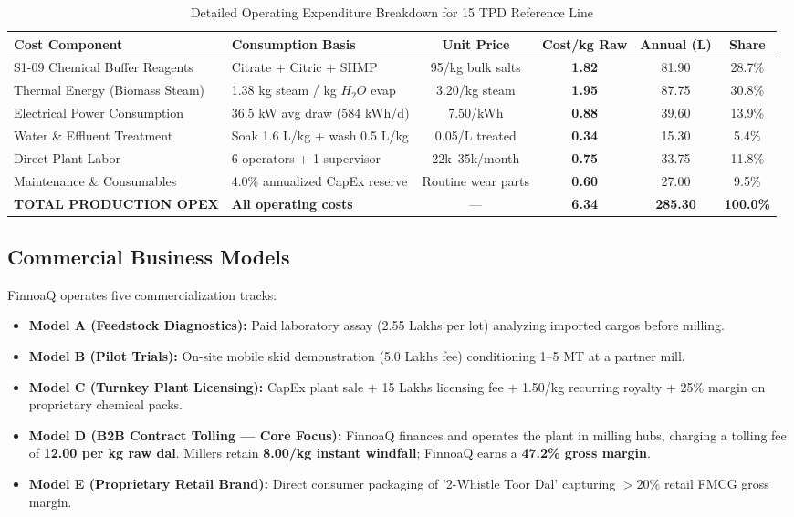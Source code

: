 \documentclass[10pt,a4paper]{article}
\newcommand{\inr}{\text{INR~}}
\begin{document}
\begin{table}[H]
\centering
\small
\caption{Detailed Operating Expenditure Breakdown for 15 TPD Reference Line}
\label{tab:opex_breakdown}
\begin{tabularx}{\linewidth}{p{3.6cm}Xcccc}
\toprule
\textbf{Cost Component} & \textbf{Consumption Basis} & \textbf{Unit Price} & \textbf{Cost/kg Raw} & \textbf{Annual (\inr L)} & \textbf{Share} \\
\midrule
S1-09 Chemical Buffer Reagents & Citrate + Citric + SHMP & \inr 95/kg bulk salts & \textbf{\inr 1.82} & 81.90 & 28.7\% \\
Thermal Energy (Biomass Steam) & 1.38 kg steam / kg $H_2O$ evap & \inr 3.20/kg steam & \textbf{\inr 1.95} & 87.75 & 30.8\% \\
Electrical Power Consumption & 36.5 kW avg draw (584 kWh/d) & \inr 7.50/kWh & \textbf{\inr 0.88} & 39.60 & 13.9\% \\
Water \& Effluent Treatment & Soak 1.6 L/kg + wash 0.5 L/kg & \inr 0.05/L treated & \textbf{\inr 0.34} & 15.30 & 5.4\% \\
Direct Plant Labor & 6 operators + 1 supervisor & \inr 22k--35k/month & \textbf{\inr 0.75} & 33.75 & 11.8\% \\
Maintenance \& Consumables & 4.0\% annualized CapEx reserve & Routine wear parts & \textbf{\inr 0.60} & 27.00 & 9.5\% \\
\midrule
\textbf{TOTAL PRODUCTION OPEX} & \textbf{All operating costs} & --- & \textbf{\inr 6.34} & \textbf{285.30} & \textbf{100.0\%} \\
\bottomrule
\end{tabularx}
\end{table}

\subsection{Commercial Business Models}
FinnoaQ operates five commercialization tracks:
\begin{itemize}[leftmargin=*]
    \item \textbf{Model A (Feedstock Diagnostics):} Paid laboratory assay (\inr 2.55 Lakhs per lot) analyzing imported cargos before milling.
    \item \textbf{Model B (Pilot Trials):} On-site mobile skid demonstration (\inr 5.0 Lakhs fee) conditioning 1--5 MT at a partner mill.
    \item \textbf{Model C (Turnkey Plant Licensing):} CapEx plant sale + \inr 15 Lakhs licensing fee + \inr 1.50/kg recurring royalty + 25\% margin on proprietary chemical packs.
    \item \textbf{Model D (B2B Contract Tolling --- Core Focus):} FinnoaQ finances and operates the plant in milling hubs, charging a tolling fee of \textbf{\inr 12.00 per kg raw dal}. Millers retain \textbf{\inr 8.00/kg instant windfall}; FinnoaQ earns a \textbf{47.2\% gross margin}.
    \item \textbf{Model E (Proprietary Retail Brand):} Direct consumer packaging of '2-Whistle Toor Dal' capturing $> 20\%$ retail FMCG gross margin.
\end{itemize}
\end{document}
